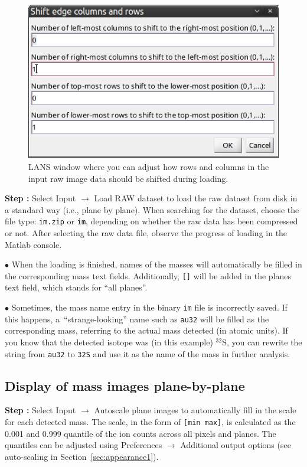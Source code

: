 \documentclass[a4paper, 11pt]{article}
\newcommand{\ttt}[1]{\texttt{#1}}
\newcommand{\lans}[1]{{\color{magenta}#1}}
\newcommand{\lanstf}[1]{{\color{cyan}#1}}
\newcommand\ra{\rightarrow}
\newcounter{step}
\newcommand\s{\addtocounter{step}{1}\vskip5pt\noindent\textbf{Step \thestep:}{ }}
\newcommand\bul{\vskip5pt\noindent$\bullet${ }}
\begin{document}
\begin{figure}[!ht]
\centering
\includegraphics[scale=0.5]{figs1/LANS-shift-rows-columns}
\caption{\label{fig:shiftrowcolumn}%
LANS window where you can adjust how rows and columns in the input raw image data should be shifted during loading.}
\end{figure}

\s Select \lans{Input} $\ra$ \lans{Load RAW dataset} to load the raw dataset from disk in a standard way (i.e., plane by plane). When searching for the dataset, choose the file type: \ttt{im.zip} or \ttt{im}, depending on whether the raw data has been compressed or not. After selecting the raw data file, observe the progress of loading in the Matlab console. 

\bul When the loading is finished, names of the masses will automatically be filled in the corresponding \lanstf{mass} text fields. Additionally, \ttt{[]} will be added in the \lanstf{planes} text field, which stands for ``all planes''.

\bul Sometimes, the mass name entry in the binary \ttt{im} file is incorrectly saved. If this happens, a~``strange-looking'' name such as \ttt{au32} will be filled as the corresponding \lanstf{mass}, referring to the actual mass detected (in atomic units). If you know that the detected isotope was (in this example) ${}^{32}$S, you can rewrite the string from \ttt{au32} to \ttt{32S} and use it as the name of the mass in further analysis.


\subsection{Display of mass images plane-by-plane}
\setcounter{step}{0}

\s Select \lans{Input} $\ra$ \lans{Autoscale plane images} to automatically fill in the \lanstf{scale} for each detected mass. The scale, in the form of \ttt{[min max]}, is calculated as the 0.001 and 0.999 quantile of the ion counts across all pixels and planes. The quantiles can be adjusted using \lans{Preferences} $\ra$ \lans{Additional output options} (see auto-scaling in Section~\ref{sec:appearance1}). 
\end{document}
